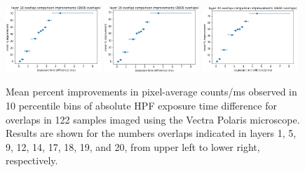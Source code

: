 \documentclass[letterpaper,11pt]{article}
\begin{document}
\begin{figure}[!ht]
\includegraphics[width=0.32\textwidth]{images/results/improvements_by_layer_polaris/layer_18_improvements_polaris}
\includegraphics[width=0.32\textwidth]{images/results/improvements_by_layer_polaris/layer_19_improvements_polaris}
\includegraphics[width=0.32\textwidth]{images/results/improvements_by_layer_polaris/layer_20_improvements_polaris}
\caption{\footnotesize Mean percent improvements in pixel-average counts/ms observed in 10 percentile bins of absolute HPF exposure time difference for overlaps in 122 samples imaged using the Vectra Polaris microscope. Results are shown for the numbers overlaps indicated in layers 1, 5, 9, 12, 14, 17, 18, 19, and 20, from upper left to lower right, respectively.}
\label{fig:improvements_as_exposure_time_layers_polaris_1}
\end{figure}
\end{document}

